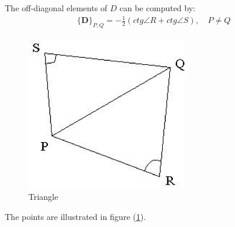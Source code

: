 \documentclass{InsightArticle}
\begin{document}
  The off-diagonal elements of $D$ can be computed by:
   \begin{eqnarray}  
      \{ \mathbf{D} \}_{P,Q } = -\frac{1}{2}(ctg\angle R + ctg\angle S), \quad P \ne Q  \label{ctg}
  \end{eqnarray}  
  \begin{figure}
  \begin{center}
    \includegraphics[width=7cm]{PntPQRS.eps} \caption{Triangle} \label{PntPQRS}
    \end{center}
  \end{figure}  
  The points are illustrated in figure (\ref{PntPQRS}).  
  
\end{document}
